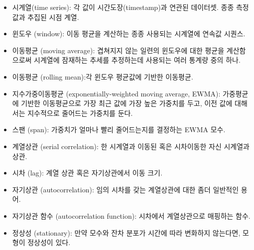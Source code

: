 \begin{itemize}

\item 시계열(time series): 각 값이 시간도장(timestamp)과 연관된 데이터셋. 종종 측정값과 추집된 시점 계열.

\item 윈도우 (window): 이동 평균을 계산하는 종종 사용되는 시계열에 연속값 시퀀스.

\item 이동평균 (moving average): 겹쳐지지 않는 일련의 윈도우에 대한 평균을 계산함으로써 시계열에 잠재하는 추세를 추정하는데 사용되는 여러 통계량 중의 하나.

\item 이동평균 (rolling mean):각 윈도우 평균값에 기반한 이동평균.

\item 지수가중이동평균 (exponentially-weighted moving average, EWMA): 
가중평균에 기반한 이동평균으로 가장 최근 값에 가장 높은 가중치를 두고, 이전 값에 대해서는 지수적으로 줄어드는 가중치를 둔다.

\item 스팬 (span): 가중치가 얼마나 빨리 줄어드는지를 결정하는 EWMA 모수.

\item 계열상관 (serial correlation): 
한 시계열과 이동된 혹은 시차이동한 자신 시계열과 상관.

\item 시차 (lag): 계열 상관 혹은 자기상관에서 이동 크기.

\item 자기상관 (autocorrelation): 임의 시차를 갖는 계열상관에 대한 좀더 일반적인 용어.

\item 자기상관 함수 (autocorrelation function): 
시차에서 계열상관으로 매핑하는 함수.

\item 정상성 (stationary): 만약 모수와 잔차 분포가 시간에 따라 변화하지 않는다면, 모형이 정상성이 있다.

\end{itemize}

